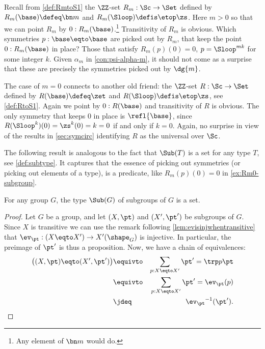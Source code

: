 \begin{example}\label{ex:Rm0-subgroup} 
Recall from \cref{def:RmtoS1} the $\ZZ$-set
$R_m : \Sc\to\Set$ defined by $R_m(\base) \defeq \bn m$ and
$R_m(\Sloop) \defis \etop\zs$. Here $m>0$ so that we can point
$R_m$ by $0: R_m(\base)$.\footnote{Any element of $\bn m$ would do.}
Transitivity of $R_m$ is obvious.
Which symmetries $p: \base\eqto\base$ are picked out by $R_m$,
that keep the point $0: R_m(\base)$ in place? Those that 
satisfy $R_m(p)(0)=0$, \ie $p=\Sloop^{mk}$ for some integer $k$.
Given $\alpha_m$ in \cref{con:psi-alpha-m}, it should not come as a
surprise that these are precisely the symmetries picked out by $\dg{m}$.

The case of $m=0$ connects to another old friend: the $\ZZ$-set
$R : \Sc\to\Set$ defined by $R(\base) \defeq \zet$ and
$R(\Sloop) \defis \etop\zs$, see \cref{def:RtoS1}.
Again we point by $0: R(\base)$ and transitivity of $R$ is obvious.
The only symmetry that keeps $0$ in place is $\refl{\base}$,
since $R(\Sloop^k)(0) = \zs^k(0) = k = 0$ if and only if $k=0$.
Again, no surprise in view of the results in \cref{sec:symcirc}
identifying $R$ as the universal \covering over $\Sc$.
\end{example}

The following result is analogous to the fact that $\Sub(T)$ is
a set for any type $T$, see \cref{def:subtype}. It captures
that the essence of picking out symmetries (or picking out elements
of a type), is a predicate, like $R_m(p)(0)=0$ in \cref{ex:Rm0-subgroup}.

\begin{lemma}
  \label{lem:SubGisset}%
  For any group $G$, the type $\Sub(G)$ of subgroups of $G$ is a set.
\end{lemma}
\begin{proof}
  Let $G$ be a group, and let $(X,\pt)$ and $(X',\pt')$ be subgroups of $G$. Since
  $X$ is transitive we can use the remark following
  \cref{lem:evisinjwhentransitive} that $\ev_{\pt} : (X \eqto X') \to X'(\sh_G)$ is
  injective. In particular, the preimage of $\pt'$ is thus a proposition. Now, we
  have a chain of equivalences:
  \begin{eqnarray*}  
    \left((X,\pt)\eqto(X',\pt')\right)
    & \equivto & \displaystyle\sum_{p:X \eqto X'} \pt' = \trp p {\pt} \\
    & \equivto & \displaystyle\sum_{p:X \eqto X'} \pt' = \ev_{\pt}(p) \\
    & \jdeq & {\ev_{\pt}}^{-1} (\pt'). \qedhere
  \end{eqnarray*}
\end{proof}

